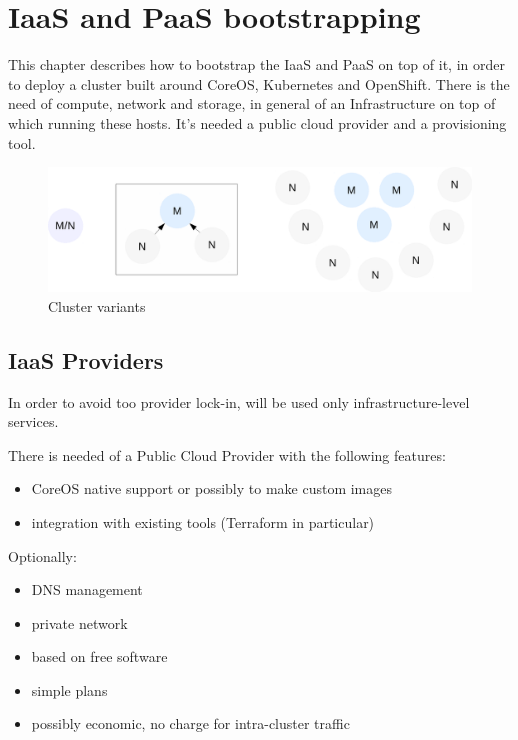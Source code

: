 \chapter{IaaS and PaaS bootstrapping}\label{iaas-and-paas-bootstrapping}

This chapter describes how to bootstrap the IaaS and PaaS on top of it,
in order to deploy a cluster built around CoreOS, Kubernetes and
OpenShift. There is the need of compute, network and storage, in general
of an Infrastructure on top of which running these hosts. It's needed a
public cloud provider and a provisioning tool.

\begin{figure}[htbp]
\centering
\includegraphics{media/ch4-clusters.png}
\caption{Cluster variants}
\end{figure}

\section{IaaS Providers}\label{iaas-providers}

In order to avoid too provider lock-in, will be used only
infrastructure-level services.

There is needed of a Public Cloud Provider with the following features:

\begin{itemize}
\itemsep1pt\parskip0pt
\item
  CoreOS native support or possibly to make custom images
\item
  integration with existing tools (Terraform in particular)
\end{itemize}

Optionally:

\begin{itemize}
\itemsep1pt\parskip0pt
\item
  DNS management
\item
  private network
\item
  based on free software
\item
  simple plans
\item
  possibly economic, no charge for intra-cluster traffic
\end{itemize}


